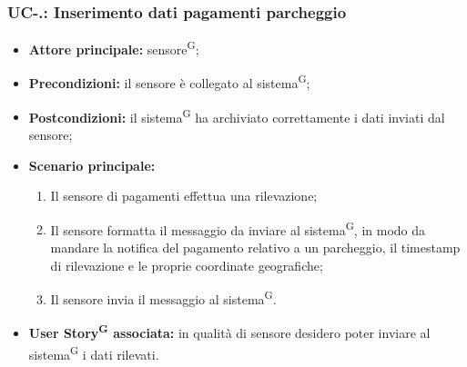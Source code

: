 \documentclass[8pt]{article}
\newcommand{\glossterm}[1]{#1\textsuperscript{G}} %
\begin{document}
\subsubsection*{UC-\theuc .\speconenumber: Inserimento dati pagamenti parcheggio}
\begin{itemize}
    \item \textbf{Attore principale:} \glossterm{sensore};
    \item \textbf{Precondizioni:} il sensore è collegato al \glossterm{sistema};
    \item \textbf{Postcondizioni:} il \glossterm{sistema} ha archiviato correttamente i dati inviati dal sensore;
    \item \textbf{Scenario principale:}
        \begin{enumerate}
        \item Il sensore di pagamenti effettua una rilevazione;
        \item Il sensore formatta il messaggio da inviare al \glossterm{sistema}, in modo da mandare la notifica del pagamento relativo a un parcheggio, il timestamp di rilevazione e le proprie coordinate geografiche;
        \item Il sensore invia il messaggio al \glossterm{sistema}.
        \end{enumerate}
    \item \textbf{\glossterm{User Story} associata:} in qualità di sensore desidero poter inviare al \glossterm{sistema} i dati rilevati.
\end{itemize}
\end{document}
